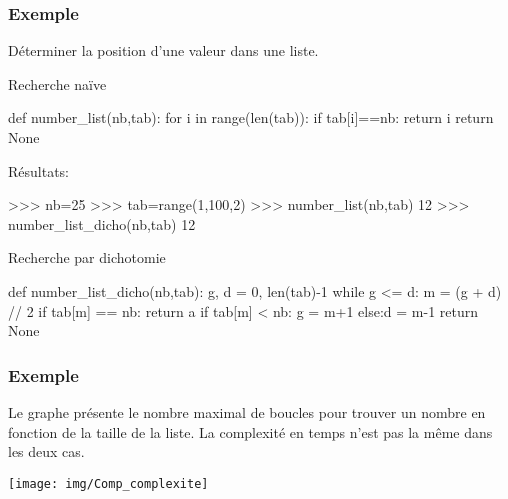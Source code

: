 \begin{frame}[fragile]
\frametitle{Exemple}

Déterminer la position d'une valeur dans une liste.

\begin{minipage}[t]{0.48\linewidth}
Recherche naïve
\begin{GrayBox}[0.75\textwidth]
\begin{verbatimtab}[3]
def number_list(nb,tab):
    for i in range(len(tab)):
        if tab[i]==nb:
            return i
    return None
\end{verbatimtab}
\end{GrayBox}

Résultats:
\begin{GrayBox}[0.85\textwidth]
\begin{verbatimtab}[3]
>>> nb=25
>>> tab=range(1,100,2)
>>> number_list(nb,tab)
12
>>> number_list_dicho(nb,tab)
12
\end{verbatimtab}
\end{GrayBox}

\end{minipage}\hfill
\begin{minipage}[t]{0.48\linewidth}
Recherche par dichotomie
\begin{GrayBox}[0.85\textwidth]
\begin{verbatimtab}[3]
def number_list_dicho(nb,tab):
    g, d = 0, len(tab)-1
    while g <= d:
        m = (g + d) // 2
        if tab[m] == nb:
            return a
        if tab[m] < nb:
            g = m+1
        else:d = m-1
    return None
\end{verbatimtab}
\end{GrayBox}
\end{minipage}
\end{frame}

\begin{frame}[fragile]
\frametitle{Exemple}

Le graphe présente le nombre maximal de boucles pour trouver un nombre en fonction de la taille de la liste. La complexité en temps n'est pas la même dans les deux cas.

\begin{center}
 \texttt{[image: img/Comp\_complexite]}
\end{center}

\end{frame}


